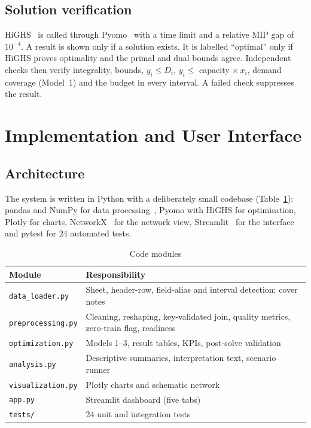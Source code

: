 \documentclass[conference]{IEEEtran}
\begin{document}
\subsection{Solution verification}
HiGHS~\cite{huangfu2018} is called through Pyomo~\cite{bynum2021} with a time limit and a relative MIP gap of
$10^{-4}$. A result is shown only if a solution exists. It is labelled ``optimal'' only if HiGHS proves optimality and
the primal and dual bounds agree. Independent checks then verify integrality, bounds, $y_i \le D_i$,
$y_i \le$ capacity $\times\, x_i$, demand coverage (Model~1) and the budget in every interval. A failed check suppresses
the result.

\section{Implementation and User Interface}\label{sec:impl}
\subsection{Architecture}
The system is written in Python with a deliberately small codebase (Table~\ref{tab:modules}): pandas and NumPy for data
processing~\cite{mckinney2010}, Pyomo with HiGHS for optimisation, Plotly for charts, NetworkX~\cite{hagberg2008} for the
network view, Streamlit~\cite{streamlit} for the interface and pytest for 24 automated tests.

\begin{table}[!t]
\caption{Code modules}\label{tab:modules}
\centering\footnotesize
\begin{tabularx}{\columnwidth}{@{}l X@{}}
\toprule
Module & Responsibility \\
\midrule
\texttt{data\_loader.py} & Sheet, header-row, field-alias and interval detection; cover notes \\
\texttt{preprocessing.py} & Cleaning, reshaping, key-validated join, quality metrics, zero-train flag, readiness \\
\texttt{optimization.py} & Models 1--3, result tables, KPIs, post-solve validation \\
\texttt{analysis.py} & Descriptive summaries, interpretation text, scenario runner \\
\texttt{visualization.py} & Plotly charts and schematic network \\
\texttt{app.py} & Streamlit dashboard (five tabs) \\
\texttt{tests/} & 24 unit and integration tests \\
\bottomrule
\end{tabularx}
\end{table}
\end{document}
